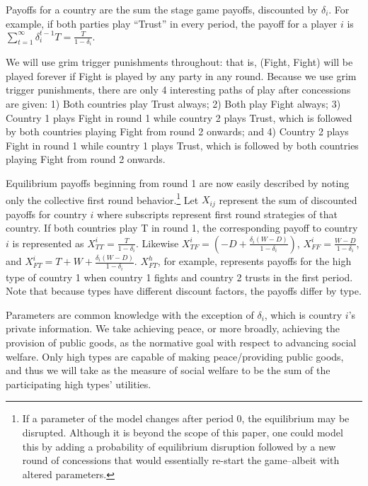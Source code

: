 \documentclass[12pt, letterpaper]{article}
\newcommand{\de}{\delta}
\begin{document}
Payoffs for a country are the sum the stage game payoffs, discounted by $\delta_i$. For example, if both parties play ``Trust'' in every period, the payoff for a player $i$ is $\sum_{t=1}^\infty \de_i^{t-1} T = \frac{T}{1-\de_i}.$

We will use grim trigger punishments throughout: that is, (Fight, Fight) will be played forever if Fight is played by any party in any round. Because we use grim trigger punishments, there are only 4 interesting paths of play after concessions are given:
1) Both countries play Trust always; 
2) Both play Fight always; 
3) Country 1 plays Fight in round 1 while country 2 plays Trust, which is followed by both countries playing Fight from round 2 onwards; and 
4) Country 2 plays Fight in round 1 while country 1 plays Trust, which is followed by both countries playing Fight from round 2 onwards.

Equilibrium payoffs beginning from round 1 are now easily described by noting only the collective first round behavior.\footnote{If a parameter of the model changes after period 0, the equilibrium may be disrupted. Although it is beyond the scope of this paper, one could model this by adding a probability of equilibrium disruption followed by a new round of concessions that would essentially re-start the game--albeit with altered parameters.} Let $X_{ij}$ represent the sum of discounted payoffs for country $i$ where subscripts represent first round strategies of that country. If both countries play T in round 1, the corresponding payoff to country $i$ is represented as $ X_{TT}^i=\frac {T}{1- \delta_i}$. Likewise $X_{TF}^i=({-D}+\frac{\delta_i(W-D)}{1- \delta_i} )$, $ X_{FF}^i=\frac{W-D}{1- \delta_i}$, and  $X_{FT}^i=T+W +\frac{\delta_i(W-D)}{1- \delta_i}$. $X_{FT}^h$, for example, represents payoffs for the high type of country 1 when country 1 fights and country 2 trusts in the first period. Note that because types have different discount factors, the payoffs differ by type.

Parameters are common knowledge with the exception of $\delta_i$, which is country $i$'s private information. We take achieving peace, or more broadly, achieving the provision of public goods, as the normative goal with respect to advancing social welfare. Only high types are capable of making peace/providing public goods, and thus we will take as the measure of social welfare to be the sum of the participating high types’ utilities.
\end{document}
